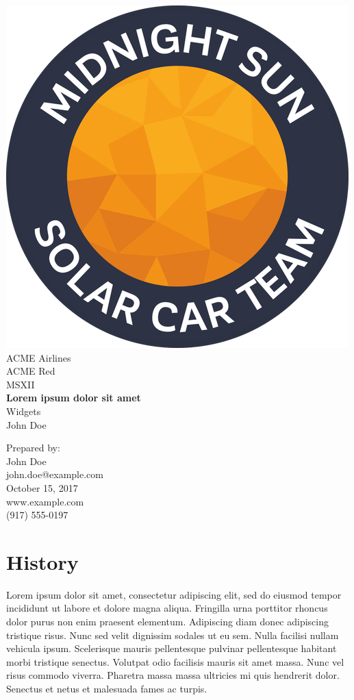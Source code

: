\documentclass[10pt]{article}
\makeatletter
\newcommand\theteamname{ACME Airlines} %
\newcommand\theuniversityname{ACME Red} %
\newcommand\theteamwebsite{www.example.com} %
\newcommand\theteamphone{(917) 555-0197} %
\newcommand\thetitle{Lorem ipsum dolor sit amet} %
\newcommand\thesubtitle{Widgets} %
\providecommand\theauthor{John Doe} %
\newcommand\theauthorcontact{john.doe@example.com} %
\newcommand\thedate{October 15, 2017} %
\makeatother
\begin{document}


\begin{titlepage}
\large
\vspace*{2cm}
\centering
\includegraphics[width=.25\textwidth]{./figures/midnightSunLogoCircle.png} \\
\vspace{1.5cm}
{\LARGE \theteamname} \\
\theuniversityname \\
\vspace{2.2cm}
{\LARGE MSXII} \\
\vspace{0.4cm}
{\huge\bfseries \thetitle} \\
\vspace{0.2cm}
{\LARGE \thesubtitle} \\
\vspace{2.2cm}
\ifdefined \theauthor
\par Prepared by: \\
\theauthor \\
\theauthorcontact \\
\fi
\thedate \\
\vfill
\theteamwebsite \\
\theteamphone
\end{titlepage}

\tableofcontents
\listoffigures %

\section{History}
Lorem ipsum dolor sit amet, consectetur adipiscing elit, sed do eiusmod tempor incididunt ut labore et dolore magna aliqua. Fringilla urna porttitor rhoncus dolor purus non enim praesent elementum. Adipiscing diam donec adipiscing tristique risus. Nunc sed velit dignissim sodales ut eu sem. Nulla facilisi nullam vehicula ipsum. Scelerisque mauris pellentesque pulvinar pellentesque habitant morbi tristique senectus. Volutpat odio facilisis mauris sit amet massa. Nunc vel risus commodo
viverra. Pharetra massa massa ultricies mi quis hendrerit dolor. Senectus et netus et malesuada fames ac turpis.
\end{document}
